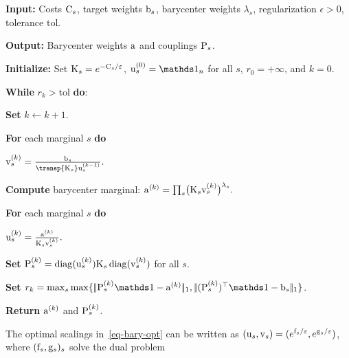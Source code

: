 \begin{alg}\label{alg:entropic-barycenter-sinkhorn}
\textbf{Input:} Costs $\C_s$, target weights $\b_s$, barycenter weights $\lambda_s$, regularization $\epsilon>0$, tolerance $\mathrm{tol}$.

\textbf{Output:} Barycenter weights $\a$ and couplings $\P_s$.

\textbf{Initialize:} Set $\K_s=e^{-\C_s/\epsilon}$, $\uD_s^{(0)}=\ones_n$ for all $s$, \(r_0=+\infty\), and \(k=0\).

\textbf{While} \(r_k>\mathrm{tol}\) \textbf{do}:
\begin{algblock}

\textbf{Set} \(k\leftarrow k+1\).

\textbf{For} each marginal $s$ \textbf{do}
\begin{algblock}
\(\vD_s^{(k)} = \frac{\b_s}{\transp{\K_s}\uD_s^{(k-1)}}.\)
\end{algblock}
\textbf{Compute} barycenter marginal:
\(\a^{(k)} = \prod_s \bigl(\K_s\vD_s^{(k)}\bigr)^{\lambda_s}.\)

\textbf{For} each marginal $s$ \textbf{do}
\begin{algblock}
\(\uD_s^{(k)} = \frac{\a^{(k)}}{\K_s\vD_s^{(k)}}.\)
\end{algblock}

\textbf{Set} \(\P_s^{(k)}=\diag(\uD_s^{(k)})\K_s\diag(\vD_s^{(k)})\) for all \(s\).

\textbf{Set} \(r_k=\max_s \max\{\norm{\P_s^{(k)}\ones-\a^{(k)}}_1,\norm{(\P_s^{(k)})^\top\ones-\b_s}_1\}\).
\end{algblock}
\algreturnskip
\textbf{Return} \(\a^{(k)}\) and \(\P_s^{(k)}\).
\end{alg}

\begin{prop}\label{prop-dual-entropic-barycenters}
	The optimal scalings in~\eqref{eq-bary-opt} can be written as $(\uD_s,\vD_s)=(e^{\fD_s/\epsilon},e^{\gD_s/\epsilon})$, where $(\fD_s,\gD_s)_s$ solve the dual problem
\end{prop}

